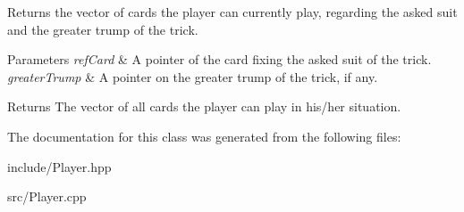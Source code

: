 Returns the vector of cards the player can currently play, regarding the asked suit and the greater trump of the trick. 


\begin{DoxyParams}{Parameters}
{\em ref\-Card} & A pointer of the card fixing the asked suit of the trick. \\
\hline
{\em greater\-Trump} & A pointer on the greater trump of the trick, if any. \\
\hline
\end{DoxyParams}
\begin{DoxyReturn}{Returns}
The vector of all cards the player can play in his/her situation. 
\end{DoxyReturn}


The documentation for this class was generated from the following files\-:\begin{DoxyCompactItemize}
\item 
include/Player.\-hpp\item 
src/Player.\-cpp\end{DoxyCompactItemize}
